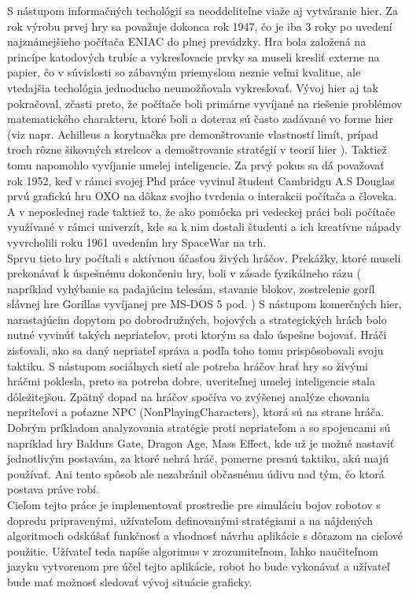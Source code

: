 \indent S nástupom informačných techológií sa neoddeliteľne viaže aj vytváranie hier. Za rok výrobu prvej hry sa považuje dokonca rok 1947, čo je iba 3 roky po uvedení najznámejšieho počítača ENIAC do plnej prevádzky. Hra bola založená na princípe katodových trubíc a vykresľovacie prvky sa museli kresliť externe na papier, čo v súvislosti so zábavným priemyslom neznie veľmi kvalitne, ale vtedajšia techológia jednoducho neumožňovala vykresľovať. Vývoj hier aj tak pokračoval, zčasti preto, že počítače boli primárne vyvíjané na riešenie problémov matematického charakteru, ktoré boli a doteraz sú často zadávané vo forme hier (viz napr. Achilleus a korytnačka pre demonštrovanie vlastností limít, prípad troch rôzne šikovných strelcov a demoštrovanie stratégií v teorií hier ). Taktiež tomu napomohlo vyvíjanie umelej inteligencie. Za prvý pokus sa dá považovať rok 1952, keď v rámci svojej Phd práce vyvinul študent Cambridgu A.S Douglas prvú grafickú hru OXO na dôkaz svojho tvrdenia o interakcii počítača a človeka. A v neposlednej rade taktiež to, že ako pomôcka pri vedeckej práci boli počítače využívané v rámci univerzít, kde sa k nim dostali študenti a ich kreatívne nápady vyvrcholili roku 1961 uvedením hry SpaceWar na trh. \\
\indent Sprvu tieto hry počítali s aktívnou účasťou živých hráčov. Prekážky, ktoré museli prekonávať k úspešnému dokončeniu hry, boli v zásade fyzikálneho rázu ( napríklad vyhýbanie sa padajúcim telesám, stavanie blokov, zostrelenie goríl slávnej hre Gorillas vyvíjanej pre MS-DOS 5 pod. ) S nástupom komerčných hier, narastajúcim dopytom po dobrodružných, bojových a strategických hrách bolo nutné vyvinúť takých nepriateľov, proti ktorým sa dalo úspešne bojovať. Hráči zisťovali, ako sa daný nepriateľ správa a podľa toho tomu prispôsobovali svoju taktiku. S nástupom sociálnych sietí ale potreba hráčov hrať hry so živými hráčmi poklesla, preto sa potreba dobre, uveriteľnej umelej inteligencie stala dôležitejšou. Zpätný dopad na hráčov spočíva vo zvýšenej analýze chovania nepriteľovi a poťazne NPC (NonPlayingCharacters), ktorá sú na strane hráča. Dobrým príkladom analyzovania stratégie proti nepriateľom a so spojencami sú napríklad hry Baldurs Gate, Dragon Age, Mass Effect, kde už je možné nastaviť jednotlivým postavám, za ktoré nehrá hráč, pomerne presnú taktiku, akú majú používať. Ani tento spôsob ale nezabránil občasnému údivu nad tým, čo ktorá postava práve robí. \\
\indent Cieľom tejto práce je implementovať prostredie pre simuláciu bojov robotov s dopredu pripravenými, užívateľom definovanými stratégiami a na nájdených algoritmoch odskúšať funkčnosť a vhodnosť návrhu aplikácie s dôrazom na cieľové použitie. Užívateľ teda napíše algorimus v zrozumiteľnom, ľahko naučiteľnom jazyku vytvorenom pre účel tejto aplikácie, robot ho bude vykonávať a užívateľ bude mať možnosť sledovať vývoj situácie graficky.
